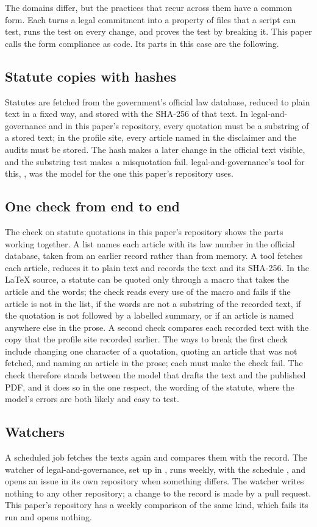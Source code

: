 \documentclass[11pt]{article}
\newcommand{\srcq}[1]{\directlua{srcq("\luaescapestring{#1}")}}
\newcommand{\ev}[1]{\directlua{ev("\luaescapestring{#1}")}}
\begin{document}
The domains differ, but the practices that recur across them have a common form. Each turns a legal commitment into a property of files that a script can test, runs the test on every change, and proves the test by breaking it. This paper calls the form compliance as code. Its parts in this case are the following.

\subsection{Statute copies with hashes}
Statutes are fetched from the government's official law database, reduced to plain text in a fixed way, and stored with the SHA-256 of that text. In legal-and-governance and in this paper's repository, every quotation must be a substring of a stored text; in the profile site, every article named in the disclaimer and the audits must be stored. The hash makes a later change in the official text visible, and the substring test makes a misquotation fail. legal-and-governance's tool for this, \ev{lg-tool}, was the model for the one this paper's repository uses.

\subsection{One check from end to end}
The check on statute quotations in this paper's repository shows the parts working together. A list names each article with its law number in the official database, taken from an earlier record rather than from memory. A tool fetches each article, reduces it to plain text and records the text and its SHA-256. In the LaTeX source, a statute can be quoted only through a macro that takes the article and the words; the check reads every use of the macro and fails if the article is not in the list, if the words are not a substring of the recorded text, if the quotation is not followed by a labelled summary, or if an article is named anywhere else in the prose. A second check compares each recorded text with the copy that the profile site recorded earlier. The ways to break the first check include changing one character of a quotation, quoting an article that was not fetched, and naming an article in the prose; each must make the check fail. The check therefore stands between the model that drafts the text and the published PDF, and it does so in the one respect, the wording of the statute, where the model's errors are both likely and easy to test.

\subsection{Watchers}
A scheduled job fetches the texts again and compares them with the record. The watcher of legal-and-governance, set up in \ev{pr-lg-1}, runs weekly, with the schedule \srcq{lg-watch}, and opens an issue in its own repository when something differs. The watcher writes nothing to any other repository; a change to the record is made by a pull request. This paper's repository has a weekly comparison of the same kind, which fails its run and opens nothing.
\end{document}
